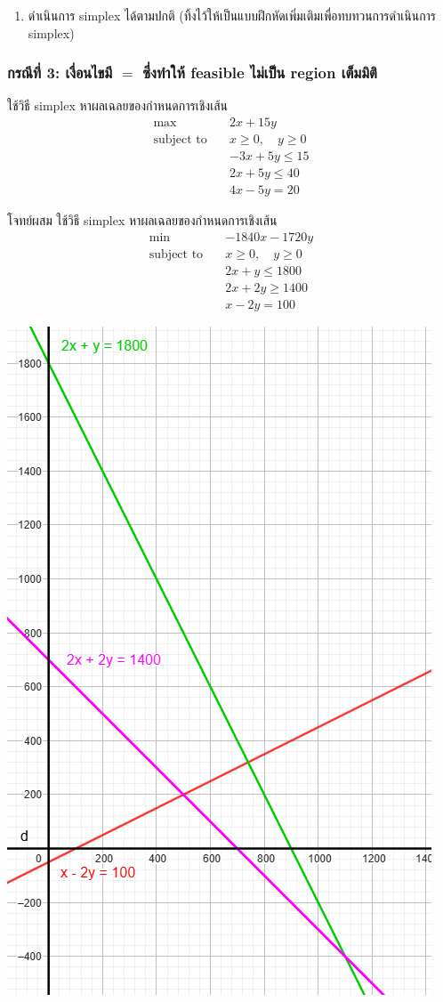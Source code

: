 \begin{solution}
\begin{enumerate}[label=\textbf{ขั้นที่ \arabic*:}, align=left, labelwidth=5em, labelsep=1em, leftmargin=*, itemsep=16pt, topsep=0pt, parsep=0pt, partopsep=0pt]
    \item ดำเนินการ simplex ได้ตามปกติ (ทิ้งไว้ให้เป็นแบบฝึกหัดเพิ่มเติมเพื่อทบทวนการดำเนินการ simplex)
    \end{enumerate}
\end{solution}

\subsubsection{กรณีที่ 3: เงื่อนไขมี $=$ ซึ่งทำให้ feasible ไม่เป็น region เต็มมิติ}
\begin{example}
    {}{}
    ใช้วิธี simplex หาผลเฉลยของกำหนดการเชิงเส้น
    \begin{align*}
        \max \quad & 2x + 15y \\
        \text{subject to} \quad
        & x \geq 0, \quad y \geq 0 \\
        & -3x + 5y \leq 15\\
        & 2x + 5y \leq 40\\
        & 4x -5y = 20
    \end{align*}
\end{example}
\newpage
\begin{example}
    {โจทย์ผสม}{}
    ใช้วิธี simplex หาผลเฉลยของกำหนดการเชิงเส้น
    \begin{align*}
        \min \quad & -1840x - 1720y \\
        \text{subject to} \quad
        & x \geq 0, \quad y \geq 0 \\
        & 2x+y \leq 1800\\
        & 2x + 2y \geq 1400\\
        & x -2y = 100
    \end{align*}
\end{example}
\includegraphics[width=0.5\linewidth]{ex-simplex-mix.png}


